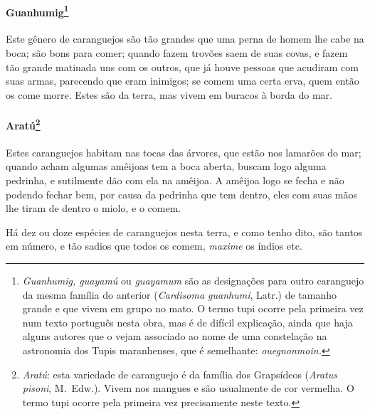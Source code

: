 \paragraph{Guanhumig\footnote{ \textit{Guanhumig, guayamú} ou
\textit{guayamum} são as designações para outro caranguejo da mesma
família do anterior (\textit{Cardisoma guanhumi}, Latr.) de tamanho
grande e que vivem em grupo no mato. O termo tupi ocorre pela primeira
vez num texto português nesta obra, mas é de difícil explicação, ainda
que haja alguns autores que o vejam associado ao nome de uma
constelação na astronomia dos Tupis maranhenses, que é semelhante:
\textit{ouegnonmoin.}}} Este gênero de caranguejos são tão
grandes que uma perna de homem lhe cabe na boca; são bons para comer;
quando fazem trovões saem de suas covas, e fazem tão grande matinada
uns com os outros, que já houve pessoas que acudiram com suas armas,
parecendo que eram inimigos; se comem uma certa erva, quem então os
come morre. Estes são da terra, mas vivem em buracos à borda do mar.

\paragraph{Aratú\footnote{ \textit{Aratú}: esta variedade de caranguejo
é da família dos Grapsídeos (\textit{Aratus pisoni}, M.~Edw.). Vivem nos
mangues e são usualmente de cor vermelha. O termo tupi ocorre pela
primeira vez precisamente neste texto.}} Estes caranguejos
habitam nas tocas das árvores, que estão nos lamarões do mar; quando
acham algumas amêijoas tem a boca aberta, buscam logo alguma pedrinha,
e sutilmente dão com ela na amêijoa. A amêijoa logo se fecha e não
podendo fechar bem, por causa da pedrinha que tem dentro, eles com suas
mãos lhe tiram de dentro o miolo, e o comem.

 Há dez ou doze espécies de caranguejos nesta terra, e como tenho dito,
são tantos em número, e tão sadios que todos os comem, \textit{maxime} os
índios etc.

